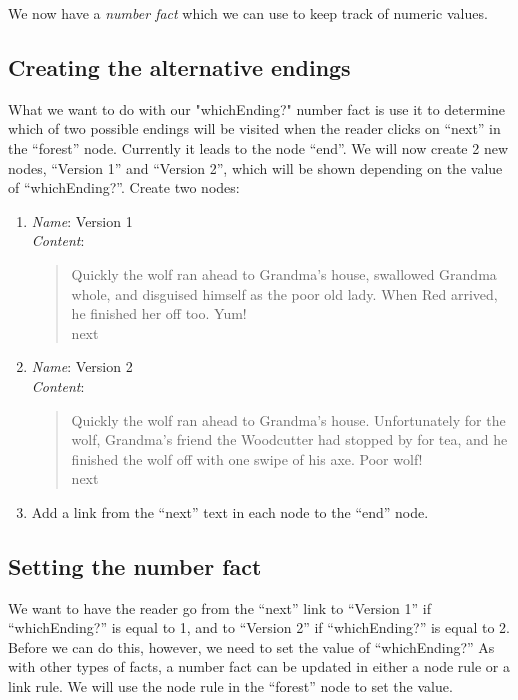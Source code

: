 \documentclass{article}
\begin{document}
We now have a \textit{number fact} which we can use to keep track of 
numeric values.

\subsection{Creating the alternative endings}

What we want to do with our "whichEnding?" number fact is use it to 
determine which of two possible endings will be visited when the 
reader clicks on ``next'' in the ``forest'' node. Currently it leads 
to the node ``end''. We will now create 2 new nodes, ``Version 1'' 
and ``Version 2'', which will be shown depending on the value of 
``whichEnding?''. Create two nodes:

\begin{enumerate}
  \item \textit{Name}: Version 1\\
  \textit{Content}: 
  \begin{quotation}
  \noindent Quickly the wolf ran ahead to Grandma's house, swallowed 
  Grandma whole, and disguised himself as the poor old lady. When Red 
  arrived, he finished her off too. Yum! \\

  \noindent next
  \end{quotation}
  \item \textit{Name}: Version 2\\
  \textit{Content}: 
  \begin{quotation}
  \noindent Quickly the wolf ran ahead to Grandma's house. 
  Unfortunately for the wolf, Grandma's friend the Woodcutter had 
  stopped by for tea, and he finished the wolf off with one swipe of 
  his axe. Poor wolf! \\

  \noindent next
  \end{quotation}
  \item Add a link from the ``next'' text in each node to the ``end'' node.
\end{enumerate}


\subsection{Setting the number fact}

We want to have the reader go from the ``next'' link to ``Version 1'' 
if ``whichEnding?'' is equal to 1, and to ``Version 2'' if 
``whichEnding?'' is equal to 2. Before we can do this, however, we 
need to set the value of ``whichEnding?'' As with other types of 
facts, a number fact can be updated in either a node rule or a link 
rule. We will use the node rule in the ``forest'' node to set the 
value.       
\end{document}
